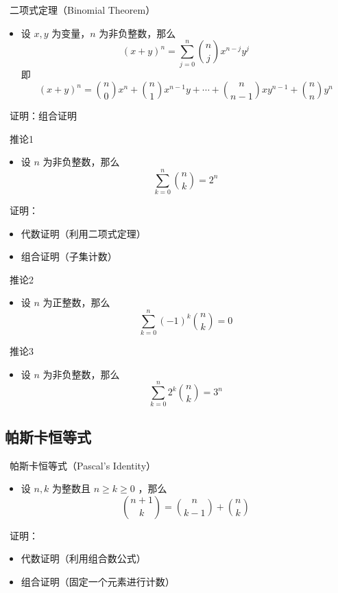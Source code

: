 \documentclass[UTF8]{report}
\theoremstyle{MyLineTheoremStyle} %
\theoremstyle{MyBlockTheoremStyle} %
\theoremstyle{MySubsubsectionStyle} %
\begin{document}
\textbullet\ 二项式定理（Binomial Theorem）
\begin{itemize}
    \item 设 $x, y$ 为变量，$n$ 为非负整数，那么
    \[
    (x + y)^n = \sum_{j=0}^{n} \binom{n}{j} x^{n-j} y^j
    \]
    即
    \[
    (x + y)^n = \binom{n}{0} x^n + \binom{n}{1} x^{n-1} y + \cdots + \binom{n}{n-1} xy^{n-1} + \binom{n}{n} y^n
    \]
\end{itemize}

\textbullet\ 证明：组合证明

\textbullet\ 推论1
\begin{itemize}
    \item 设 $n$ 为非负整数，那么
    \[
    \sum_{k=0}^{n} \binom{n}{k} = 2^n
    \]
\end{itemize}

\textbullet\ 证明：
\begin{itemize}
    \item 代数证明（利用二项式定理）
    \item 组合证明（子集计数）
\end{itemize}

\textbullet\ 推论2
\begin{itemize}
    \item 设 $n$ 为正整数，那么
    \[
    \sum_{k=0}^{n} (-1)^k \binom{n}{k} = 0
    \]
\end{itemize}

\textbullet\ 推论3
\begin{itemize}
    \item 设 $n$ 为非负整数，那么
    \[
    \sum_{k=0}^{n} 2^k \binom{n}{k} = 3^n
    \]
\end{itemize}

\subsection{帕斯卡恒等式}
\textbullet\ 帕斯卡恒等式（Pascal’s Identity）
\begin{itemize}
    \item 设 $n, k$ 为整数且 $n \geq k \geq 0$ ，那么
    \[
    \binom{n+1}{k} = \binom{n}{k-1} + \binom{n}{k}
    \]
\end{itemize}

\textbullet\ 证明：
\begin{itemize}
    \item 代数证明（利用组合数公式）
    \item 组合证明（固定一个元素进行计数）
\end{itemize}
\end{document}
